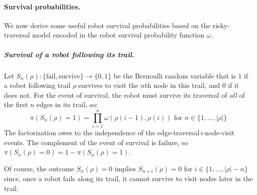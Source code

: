 \documentclass[11pt, oneside]{article}
\begin{document}
\paragraph{Survival probabilities.} 
We now derive some useful robot survival probabilities based on the risky-traversal model encoded in the robot survival probability function $\omega$.

\subparagraph{Survival of a robot following its trail.}
Let $S_n(\rho) : \{\text{fail}, \text{survive}\} \rightarrow \{0, 1\} $ be the Bernoulli random variable that is $1$ if a robot following trail $\rho$ survives to visit the $n$th node in this trail, and $0$ if it does not. For the event of survival, the robot must survive its traversal of \emph{all} of the first $n$ edges in its trail, so:
\begin{equation}
	\pi(S_n(\rho) = 1) = \prod_{i=1}^n \omega(\rho(i-1), \rho(i)) \text{ for } n\in \{1, ..., \lvert \rho \rvert\} \label{eq:pi_S_n}
\end{equation} The factorization owes to the independence of the edge-traversal$+$node-visit events.
The complement of the event of survival is failure, so $\pi(S_n(\rho) = 0)=1-\pi(S_n(\rho) = 1)$.

Of course, the outcome $S_n(\rho)=0$ implies $S_{n+i}(\rho)=0$ for $i \in \{1, ..., \lvert \rho \rvert - n\}$ since, once a robot fails along its trail, it cannot survive to visit nodes later in the trail.
\end{document}
